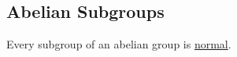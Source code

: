 \subsection{Abelian Subgroups}\label{abeliansubgroups}

Every subgroup of an abelian group is \hyperref[normalsubgroup]{normal}.